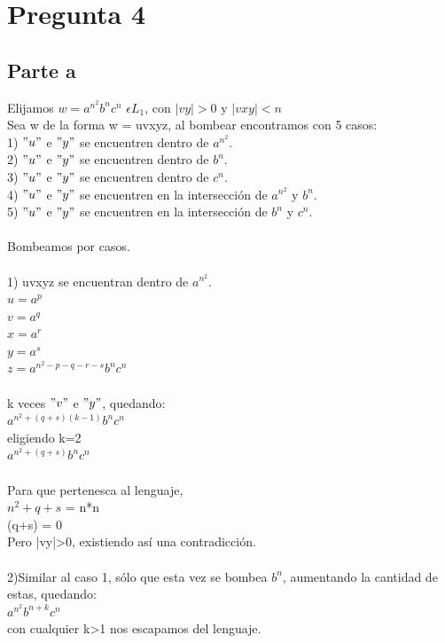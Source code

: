 \documentclass[11pt,letterpaper]{article}
\begin{document}
\section{Pregunta 4}
\subsection{Parte a}
Elijamos $w = a^{n^2}b^nc^n$ $\epsilon L_{1}$, con $|vy|>0$ y $|vxy|<n$ \\
Sea w de la forma w = uvxyz, al bombear encontramos con 5 casos: \\
1) $"u"$ e $"y"$ se encuentren dentro de $a^{n^2}$. \\
2) $"u"$ e $"y"$ se encuentren dentro de $b^n$. \\
3) $"u"$ e $"y"$ se encuentren dentro de $c^n$. \\
4) $"u"$ e $"y"$ se encuentren en la intersección de $a^{n^2}$ y $b^n$. \\
5) $"u"$ e $"y"$ se encuentren en la intersección de $b^n$ y $c^n$. \\
 \\
Bombeamos por casos. \\
 \\
1) uvxyz se encuentran dentro de $a^{n^2}$. \\
\indent $u=a^p$ \\
\indent $v=a^q$ \\
\indent $x=a^r$ \\
\indent $y=a^s$ \\
\indent $z=a^{n^2-p-q-r-s}b^nc^n$ \\
 \\
\indent k veces $"v"$ e $"y"$, quedando: \\
\indent $a^{n^2+(q+s)(k-1)}b^nc^n$ \\
\indent eligiendo k=2 \\
\indent $a^{n^2+(q+s)}b^nc^n$ \\
 \\
\indent Para que pertenesca al lenguaje, \\
\indent $n^2+q+s$ = n*n \\
\indent (q+s) = 0 \\
\indent Pero |vy|>0, existiendo así una contradicción. \\
 \\
2)Similar al caso 1, sólo que esta vez se bombea $b^n$, aumentando la cantidad de estas, quedando: \\
\indent $a^{n^2}b^{n+k}c^n$ \\
\indent con cualquier k>1 nos escapamos del lenguaje. \\
\end{document}

